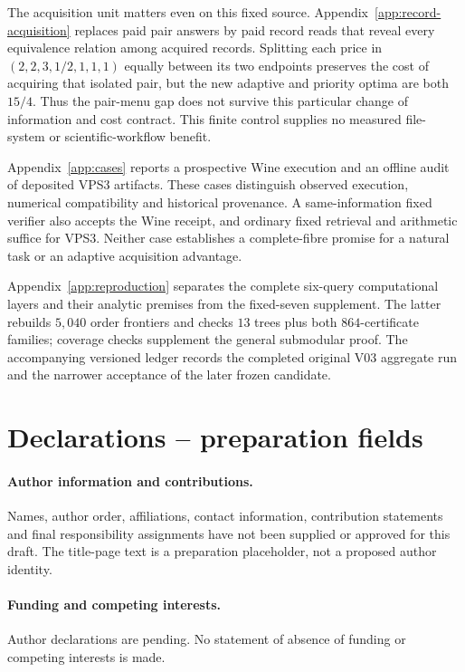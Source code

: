 \documentclass[pdflatex,sn-mathphys-num]{sn-jnl}
\theoremstyle{thmstyleone}
\theoremstyle{thmstylethree}
\theoremstyle{thmstyletwo}
\begin{document}
The acquisition unit matters even on this fixed source. Appendix~\ref{app:record-acquisition} replaces paid pair answers by paid record reads that reveal every equivalence relation among acquired records. Splitting each price in $(2,2,3,1/2,1,1,1)$ equally between its two endpoints preserves the cost of acquiring that isolated pair, but the new adaptive and priority optima are both $15/4$. Thus the pair-menu gap does not survive this particular change of information and cost contract. This finite control supplies no measured file-system or scientific-workflow benefit.

Appendix~\ref{app:cases} reports a prospective Wine execution and an offline audit of deposited VPS3 artifacts. These cases distinguish observed execution, numerical compatibility and historical provenance. A same-information fixed verifier also accepts the Wine receipt, and ordinary fixed retrieval and arithmetic suffice for VPS3. Neither case establishes a complete-fibre promise for a natural task or an adaptive acquisition advantage.

Appendix~\ref{app:reproduction} separates the complete six-query computational layers and their analytic premises from the fixed-seven supplement. The latter rebuilds $5,040$ order frontiers and checks $13$ trees plus both $864$-certificate families; coverage checks supplement the general submodular proof. The accompanying versioned ledger records the completed original V03 aggregate run and the narrower acceptance of the later frozen candidate.
\label{page:main-end}

\backmatter
\section*{Declarations -- preparation fields}
\paragraph*{Author information and contributions.}
Names, author order, affiliations, contact information, contribution statements and final responsibility assignments have not been supplied or approved for this draft. The title-page text is a preparation placeholder, not a proposed author identity.
\paragraph*{Funding and competing interests.}
Author declarations are pending. No statement of absence of funding or competing interests is made.
\end{document}
